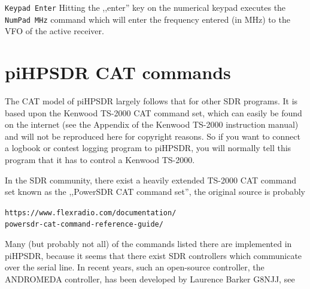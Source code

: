 \documentclass[12pt]{book}
\def\rett#1{\texttt{\color{red}#1}}
\def\bltt#1{\texttt{\color{blue}#1}}
\begin{document}
\rett{Keypad Enter} Hitting the ,,enter'' key on the numerical keypad executes the \bltt{NumPad MHz}
command which will enter the frequency entered (in MHz) to the VFO of the active receiver.


\chapter{piHPSDR CAT commands}
\label{sec:catcommands}
The CAT model of piHPSDR largely follows that for other SDR programs. It is based upon the Kenwood TS-2000 
CAT command
set, which can easily be found on the internet (see the Appendix of the Kenwood TS-2000 instruction manual) 
and will not be reproduced here
for copyright reasons. So if you want to connect a logbook
or contest logging program to piHPSDR, you will normally tell this program that it has to control a Kenwood 
TS-2000.

\begin{center}
\end{center}



In the SDR community, there exist a heavily extended TS-2000 CAT command set known as the ,,PowerSDR CAT 
command set'', the original
source is probably

\texttt{https://www.flexradio.com/documentation/}\\
\texttt{powersdr-cat-command-reference-guide/}

Many (but probably not all) of the commands listed there are implemented in piHPSDR, because it seems that 
there exist SDR controllers
which communicate over the serial line. In recent years, such an open-source controller, the ANDROMEDA 
controller, has been
developed by Laurence Barker G8NJJ, see
\end{document}
